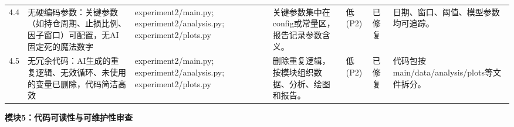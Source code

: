 \begin{longtable}{@{}L{0.045\textwidth}L{0.190\textwidth}L{0.140\textwidth}L{0.190\textwidth}L{0.060\textwidth}L{0.060\textwidth}L{0.205\textwidth}@{}}
4.4 & 无硬编码参数：关键参数（如持仓周期、止损比例、因子窗口）可配置，无AI固定死的魔法数字 & experiment2/\allowbreak{}main.py;\allowbreak{} experiment2/\allowbreak{}analysis.py;\allowbreak{} experiment2/\allowbreak{}plots.py & 关键参数集中在config或常量区，报告记录参数含义。 & 低(P2) & 已修复 & 日期、窗口、阈值、模型参数均可追踪。 \\
4.5 & 无冗余代码：AI生成的重复逻辑、无效循环、未使用的变量已删除，代码简洁高效 & experiment2/\allowbreak{}main.py;\allowbreak{} experiment2/\allowbreak{}analysis.py;\allowbreak{} experiment2/\allowbreak{}plots.py & 删除重复逻辑，按模块组织数据、分析、绘图和报告。 & 低(P2) & 已修复 & 代码包按main/\allowbreak{}data/\allowbreak{}analysis/\allowbreak{}plots等文件拆分。 \\
\end{longtable}
\endgroup

\textbf{模块5：代码可读性与可维护性审查}

